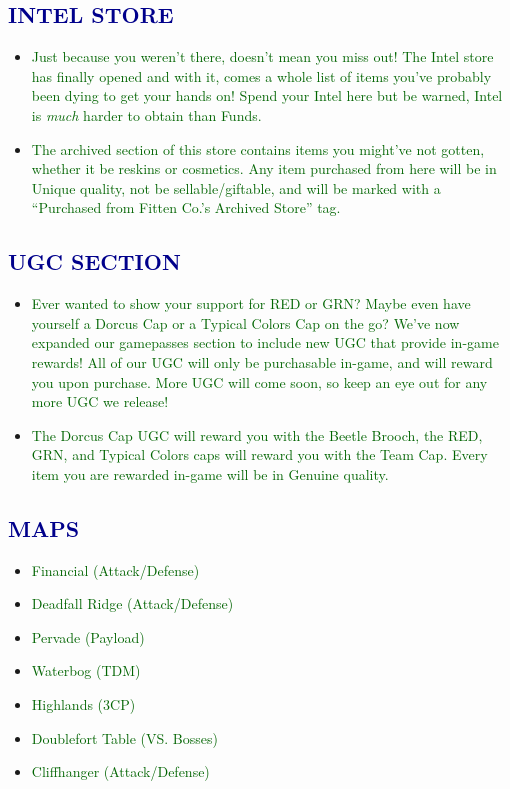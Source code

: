 \documentclass{article}
\begin{document}
\subsection*{\textcolor{darkblue}{INTEL STORE}}

\begin{itemize}
    \item \textcolor{darkgreen}{Just because you weren’t there, doesn’t mean you miss out! The Intel store has finally opened and with it, comes a whole list of items you’ve probably been dying to get your hands on! Spend your Intel here but be warned, Intel is \textit{much} harder to obtain than Funds.}
    \item \textcolor{darkgreen}{The archived section of this store contains items you might’ve not gotten, whether it be reskins or cosmetics. Any item purchased from here will be in Unique quality, not be sellable/giftable, and will be marked with a “Purchased from Fitten Co.’s Archived Store” tag.}
\end{itemize}




\subsection*{\textcolor{darkblue}{UGC SECTION}}

\begin{itemize}
    \item \textcolor{darkgreen}{Ever wanted to show your support for RED or GRN? Maybe even have yourself a Dorcus Cap or a Typical Colors Cap on the go? We’ve now expanded our gamepasses section to include new UGC that provide in-game rewards! All of our UGC will only be purchasable in-game, and will reward you upon purchase. More UGC will come soon, so keep an eye out for any more UGC we release!}
    \item \textcolor{darkgreen}{The Dorcus Cap UGC will reward you with the Beetle Brooch, the RED, GRN, and Typical Colors caps will reward you with the Team Cap. Every item you are rewarded in-game will be in Genuine quality.}
\end{itemize}




\subsection*{\textcolor{darkblue}{MAPS}}

\begin{itemize}
    \item \textcolor{darkgreen}{Financial (Attack/Defense)}
    \item \textcolor{darkgreen}{Deadfall Ridge (Attack/Defense)}
    \item \textcolor{darkgreen}{Pervade (Payload)}
    \item \textcolor{darkgreen}{Waterbog (TDM)}
    \item \textcolor{darkgreen}{Highlands (3CP)}
    \item \textcolor{darkgreen}{Doublefort Table (VS. Bosses)}
    \item \textcolor{darkgreen}{Cliffhanger (Attack/Defense)}
\end{itemize}
\end{document}
